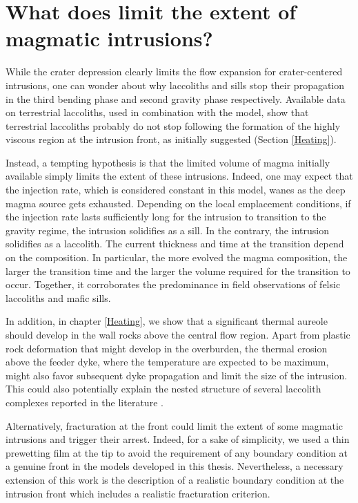 \section{What does limit the extent of magmatic intrusions?}
\label{sec:summary-2}

While  the crater  depression clearly  limits the  flow expansion  for
crater-centered intrusions,  one can  wonder about why  laccoliths and
sills stop  their propagation  in the third  bending phase  and second
gravity phase respectively. Available  data on terrestrial laccoliths,
used in combination  with the model, show  that terrestrial laccoliths
probably do  not stop  following the formation  of the  highly viscous
region  at  the  intrusion  front,  as  initially  suggested  (Section
\ref{Heating}).

Instead, a  tempting hypothesis  is that the  limited volume  of magma
initially   available    simply   limits    the   extent    of   these
intrusions. Indeed, one  may expect that the injection  rate, which is
considered constant in this model, wanes as the deep magma source gets
exhausted.  Depending  on the  local  emplacement  conditions, if  the
injection rate lasts sufficiently long for the intrusion to transition
to the  gravity regime,  the intrusion  solidifies as  a sill.  In the
contrary,  the  intrusion  solidifies  as  a  laccolith.  The  current
thickness and  time at  the transition depend  on the  composition. In
particular, the  more evolved  the magma  composition, the  larger the
transition time and the larger  the volume required for the transition
to  occur.  Together,  it   corroborates  the  predominance  in  field
observations of felsic laccoliths and mafic sills.

In  addition, in  chapter \ref{Heating},  we show  that a  significant
thermal aureole  should develop  in the wall  rocks above  the central
flow region. Apart from plastic rock deformation that might develop in
the overburden, the  thermal erosion above the feeder  dyke, where the
temperature are  expected to be  maximum, might also  favor subsequent
dyke propagation and limit the size  of the intrusion. This could also
potentially  explain   the  nested  structure  of   several  laccolith
complexes reported in the literature \citep{E:2015tl,Rocchi:2010dn}.

Alternatively, fracturation  at the  front could  limit the  extent of
some magmatic intrusions and trigger  their arrest. Indeed, for a sake
of simplicity, we used a thin prewetting  film at the tip to avoid the
requirement of any boundary condition at a genuine front in the models
developed in this thesis.  Nevertheless, a necessary extension of this
work  is the  description of  a  realistic boundary  condition at  the
intrusion front which includes a realistic fracturation criterion.

